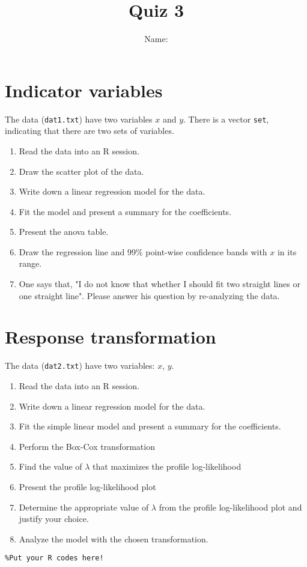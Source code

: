 \documentclass[12pt]{article}
\title{Quiz 3}
\author{Name:}%
\begin{document}
\maketitle

\section{Indicator variables}
The data (\texttt{dat1.txt}) have two variables $x$ and $y$. There is a vector \texttt{set},
indicating  that there are two sets of variables.

\begin{enumerate}
\item Read the data into an R session.
\item Draw the scatter plot of the data.
\item Write down a linear regression model for the data.
\item Fit the model and present a summary for the coefficients.
\item Present the anova table.
\item Draw the regression line and 99\% point-wise confidence bands with $x$ in its range.
\item One says that, "I do not know that whether I should fit two straight lines or one straight line".
Please answer his question by re-analyzing the data.
\end{enumerate}


\section{Response transformation}

The data (\texttt{dat2.txt}) have two variables: $x$, $y$.


\begin{enumerate}
\item Read the data into an R session.
\item Write down a linear regression model for the data.
\item Fit the simple linear model and present a summary for the coefficients.
\item Perform the Box-Cox transformation
\item Find the value of $\lambda$ that maximizes the profile log-likelihood 
\item Present the profile log-likelihood plot
\item Determine the appropriate value of $\lambda$ from the profile log-likelihood plot
and justify your choice. 
\item Analyze the model with the chosen transformation.
\end{enumerate}


\appendix
\begin{verbatim}
%Put your R codes here!
\end{verbatim}
\end{document}
